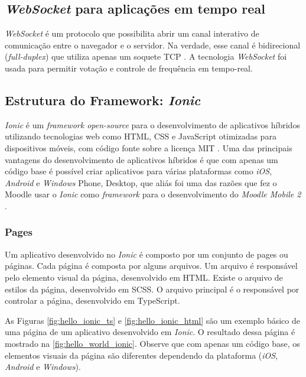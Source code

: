 \subsection{\textit{WebSocket} para aplicações em tempo real}

\textit{WebSocket} é um protocolo que possibilita abrir um canal interativo de comunicação
entre o navegador e o servidor. Na verdade, esse canal é bidirecional (\textit{full-duplex})
que utiliza apenas um soquete TCP \cite{websocket2016}.
A tecnologia \textit{WebSocket} foi usada para permitir votação e controle de frequência em tempo-real.

\subsection{Estrutura do Framework: \textit{Ionic}}

\textit{Ionic} é um \textit{framework open-source} para o desenvolvimento de aplicativos
híbridos utilizando tecnologias web como HTML,
CSS e JavaScript otimizadas
para dispositivos móveis, com código fonte sobre a licença MIT \cite{ionic2016}.
Uma das principais vantagens do desenvolvimento de aplicativos híbridos é que com
apenas um código base é possível criar aplicativos para várias plataformas como
\textit{iOS}, \textit{Android} e \textit{Windows} Phone, Desktop, que aliás foi uma das razões que fez o Moodle
usar o \textit{Ionic} como \textit{framework} para o desenvolvimento do \textit{Moodle Mobile 2} \cite{moodle2016}.

\subsubsection{Pages}

Um aplicativo desenvolvido no \textit{Ionic} é composto por um conjunto de pages ou páginas.
Cada página é composta por alguns arquivos. Um arquivo é responsável pelo
elemento visual da página, desenvolvido em HTML. Existe o arquivo de estilos da página,
desenvolvido em SCSS. O arquivo principal é o responsável por controlar a página, desenvolvido
em TypeScript.

As Figuras \ref{fig:hello_ionic_ts} e \ref{fig:hello_ionic_html} são um exemplo básico de
uma página de um aplicativo desenvolvido em \textit{Ionic}. O resultado dessa página é mostrado
na \autoref{fig:hello_world_ionic}. Observe que com apenas um código base, os elementos
visuais da página são diferentes dependendo da plataforma (\textit{iOS}, \textit{Android} e \textit{Windows}).

